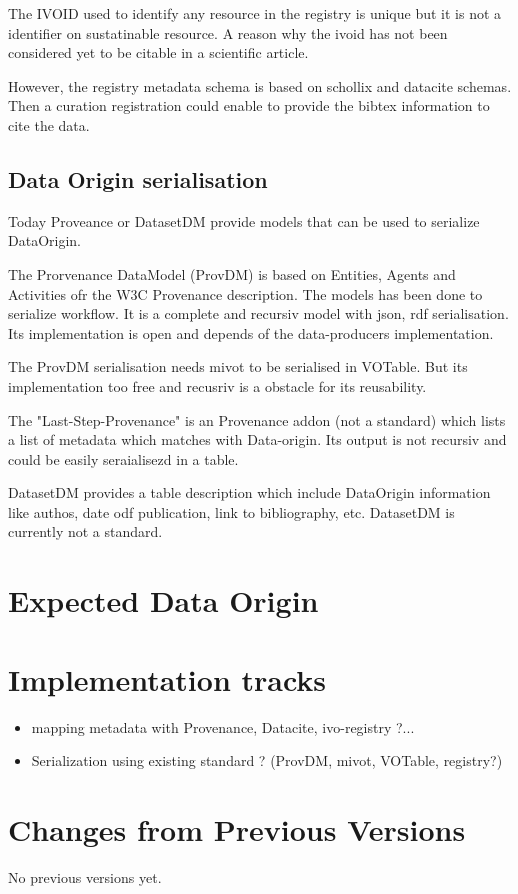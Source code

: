 \documentclass[11pt,a4paper]{ivoa}
\begin{document}
The IVOID used to identify any resource in the registry is unique but it is not a identifier on sustatinable resource. 
A reason why the ivoid has not been considered yet to be citable in a scientific article. 

However, the registry metadata schema is based on schollix and datacite schemas. Then a curation registration could enable to provide the bibtex information to cite the data.

\subsection{Data Origin serialisation}
Today Proveance or DatasetDM provide models that can be used to serialize DataOrigin.

The Prorvenance DataModel (ProvDM) is based on Entities, Agents and Activities ofr the W3C Provenance description. The models has been done to serialize workflow.
It is a complete and recursiv model with json, rdf serialisation. Its implementation is open and depends of the data-producers implementation.

The ProvDM serialisation needs mivot to be serialised in VOTable. But its implementation too free and recusriv is a obstacle for its reusability.

The "Last-Step-Provenance" is an Provenance addon (not a standard) which lists a list of metadata which matches with Data-origin. Its output is not recursiv and could be easily seraialisezd in a table.


DatasetDM provides a table description which include DataOrigin information like authos, date odf publication, link to bibliography, etc.
DatasetDM is currently not a standard.


\section{Expected Data Origin}

\section{Implementation tracks}

\begin{itemize}
\item mapping metadata with Provenance, Datacite, ivo-registry ?...
\item Serialization using existing standard ? (ProvDM, mivot, VOTable, registry?)
\end{itemize}

\appendix
\section{Changes from Previous Versions}

No previous versions yet.  






\end{document}
